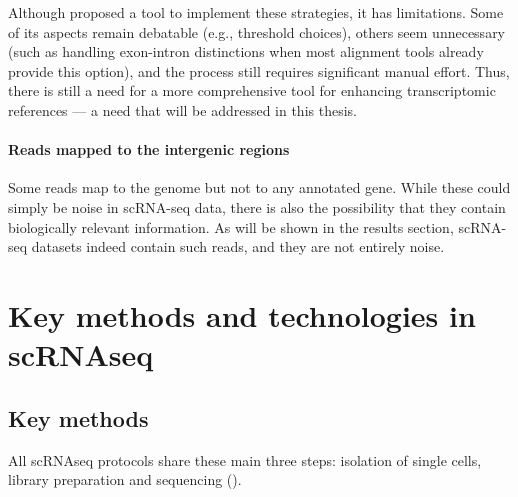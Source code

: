 Although \textcite{Pool2023} proposed a tool to implement these strategies, it has limitations.
Some of its aspects remain debatable (e.g., threshold choices), others seem unnecessary
(such as handling exon-intron distinctions when most alignment tools already provide this option),
and the process still requires significant manual effort.
Thus, there is still a need for a more comprehensive tool for enhancing transcriptomic references — a need that will be addressed in this thesis.

\paragraph{Reads mapped to the intergenic regions}
Some reads map to the genome but not to any annotated gene.
While these could simply be noise in scRNA-seq data, there is also the possibility that they contain biologically relevant information.
As will be shown in the results section, scRNA-seq datasets indeed contain such reads, and they are not entirely noise.































\iffalse
\section{Key methods and technologies in scRNAseq}

\subsection{Key methods}

All scRNAseq protocols share these main three steps:
isolation of single cells, library preparation and sequencing (\cite{Andrews2018}).


